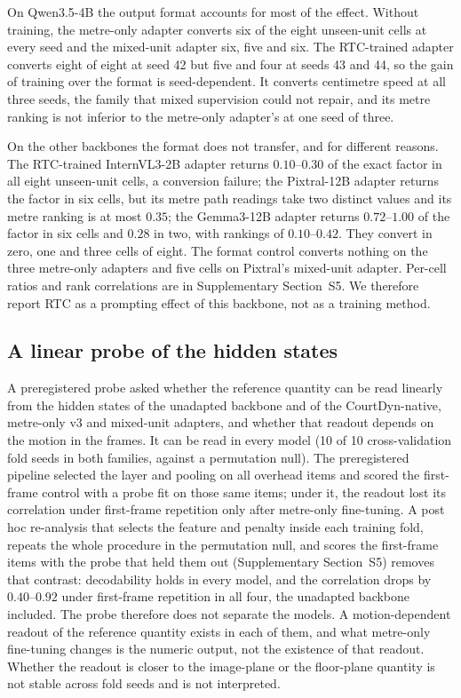 \documentclass[preprint,number]{elsarticle}
\newcommand{\supp}[1]{Supplementary Section~S#1}
\begin{document}
On Qwen3.5-4B the output format accounts for most of the effect. Without
training, the metre-only adapter converts six of the eight unseen-unit cells at every seed
and the mixed-unit adapter six, five and six. The RTC-trained adapter converts
eight of eight at seed 42 but five and four at seeds 43 and 44, so the gain of
training over the format is seed-dependent. It converts centimetre speed at
all three seeds, the family that mixed supervision could not repair, and its
metre ranking is not inferior to the metre-only adapter's at one seed of
three.

On the other backbones the format does not transfer, and for different
reasons. The RTC-trained InternVL3-2B adapter returns $0.10$--$0.30$ of the
exact factor in all eight unseen-unit cells, a conversion failure; the
Pixtral-12B adapter returns the factor in six cells, but its metre path
readings take two distinct values and its metre ranking is at most $0.35$;
the Gemma3-12B adapter returns $0.72$--$1.00$ of the factor in six cells and
$0.28$ in two, with rankings of $0.10$--$0.42$. They convert in zero,
one and three cells of eight. The format control converts nothing on
the three metre-only adapters and five cells on Pixtral's mixed-unit adapter.
Per-cell ratios and rank correlations are in \supp{5}. We therefore report RTC
as a prompting effect of this backbone, not as a training method.

\subsection{A linear probe of the hidden states}
\label{sec:probe}

A preregistered probe asked whether the reference quantity can be read
linearly from the hidden states of the unadapted backbone and of the
CourtDyn-native, metre-only v3 and mixed-unit adapters, and whether that readout
depends on the motion in the frames. It can be read in every model (10 of 10
cross-validation fold seeds in both families, against a permutation null). The
preregistered pipeline selected the layer and pooling on all overhead items and
scored the first-frame control with a probe fit on those same items; under it,
the readout lost its correlation under first-frame repetition only after
metre-only fine-tuning. A post hoc re-analysis that selects the feature and
penalty inside each training fold, repeats the whole procedure in the
permutation null, and scores the first-frame items with the probe that held
them out (\supp{5}) removes that contrast: decodability holds in every model,
and the correlation drops by $0.40$--$0.92$ under first-frame repetition in
all four, the unadapted backbone included. The probe therefore does not
separate the models. A motion-dependent readout of the reference quantity
exists in each of them, and what metre-only fine-tuning changes is the numeric
output, not the existence of that readout. Whether the readout is closer to
the image-plane or the floor-plane quantity is not stable across fold seeds
and is not interpreted.
\end{document}
